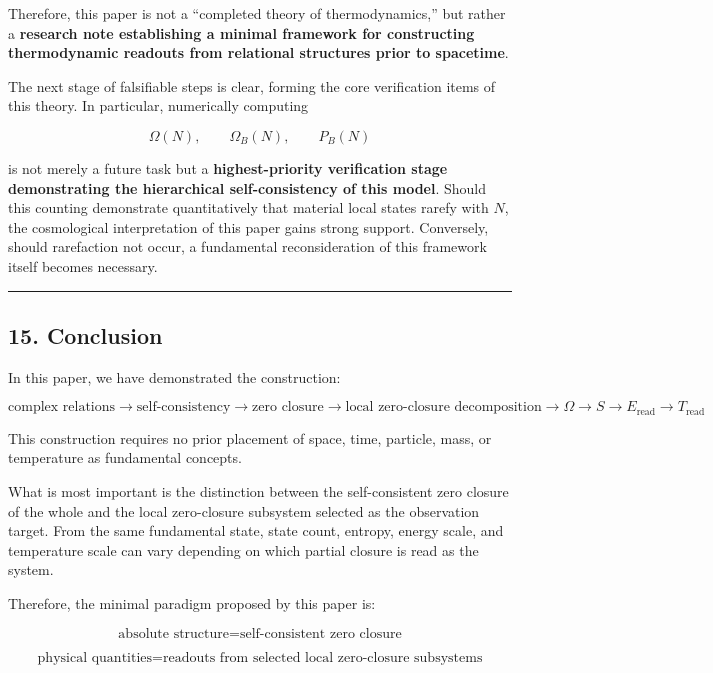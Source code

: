 \documentclass[
  a4paper,
]{article}
\begin{document}
Therefore, this paper is not a ``completed theory of thermodynamics,''
but rather a \textbf{research note establishing a minimal framework for
constructing thermodynamic readouts from relational structures prior to
spacetime}.

The next stage of falsifiable steps is clear, forming the core
verification items of this theory. In particular, numerically computing

\[
\Omega(N),
\qquad
\Omega_B(N),
\qquad
P_B(N)
\]

is not merely a future task but a \textbf{highest-priority verification
stage demonstrating the hierarchical self-consistency of this model}.
Should this counting demonstrate quantitatively that material local
states rarefy with \(N\), the cosmological interpretation of this paper
gains strong support. Conversely, should rarefaction not occur, a
fundamental reconsideration of this framework itself becomes necessary.

\begin{center}\rule{0.5\linewidth}{0.5pt}\end{center}

\subsection{15. Conclusion}\label{conclusion}

In this paper, we have demonstrated the construction:

\[
\text{complex relations}
\rightarrow
\text{self-consistency}
\rightarrow
\text{zero closure}
\rightarrow
\text{local zero-closure decomposition}
\rightarrow
\Omega
\rightarrow
S
\rightarrow
E_{\mathrm{read}}
\rightarrow
T_{\mathrm{read}}
\]

This construction requires no prior placement of space, time, particle,
mass, or temperature as fundamental concepts.

What is most important is the distinction between the self-consistent
zero closure of the whole and the local zero-closure subsystem selected
as the observation target. From the same fundamental state, state count,
entropy, energy scale, and temperature scale can vary depending on which
partial closure is read as the system.

Therefore, the minimal paradigm proposed by this paper is:

\[
\boxed{
\text{absolute structure}
=
\text{self-consistent zero closure}
}
\]

\[
\boxed{
\text{physical quantities}
=
\text{readouts from selected local zero-closure subsystems}
}
\]
\end{document}
